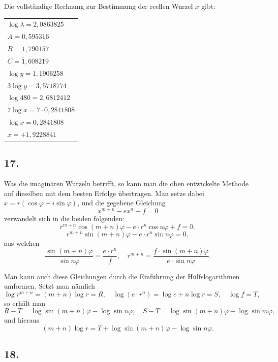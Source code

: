 \documentclass[12pt,a4paper]{article}
\newcommand{\1}{\ensuremath{\mathrlap{\,|\,}}} %
\begin{document}
Die vollständige Rechnung zur Bestimmung der reellen Wurzel $x$ gibt:

\begin{center}
\begin{tabular}{l}
$\log\lambda = 2{,}0863825$ \\
$A = 0{,}595316$ \\
$B = \overline{1}{,}790157$ \\
$C = \overline{1}{,}608219$ \\
$\log y = 1{,}1906258$ \\
$3\log y = 3{,}5718774$ \\
$\log 480 = 2{,}6812412$ \\
$7\log x = 7 \cdot 0{,}2841808$ \\
$\log x = 0{,}2841808$ \\
$x = +1{,}9228841$
\end{tabular}
\end{center}

\subsection*{17.}

Was die imaginären Wurzeln betrifft, so kann man die oben entwickelte Methode auf dieselben mit dem besten Erfolge übertragen. Man setze dabei $x = r(\cos\varphi + i\sin\varphi)$, und die gegebene Gleichung
\[x^{m+n} - ex^n + f = 0\]
verwandelt sich in die beiden folgenden:
\[r^{m+n}\cos(m+n)\varphi - e \cdot r^n\cos n\varphi + f = 0,\]
\[r^{m+n}\sin(m+n)\varphi - e \cdot r^n\sin n\varphi = 0,\]
aus welchen
\[\frac{\sin(m+n)\varphi}{\sin n\varphi} = \frac{e \cdot r^n}{f},\quad r^{m+n} = \frac{f \cdot \sin(m+n)\varphi}{e \cdot \sin n\varphi}.\]

Man kann auch diese Gleichungen durch die Einführung der Hülfslogarithmen umformen. Setzt man nämlich
\[\log r^{m+n} = (m+n)\log r = R,\quad \log(e \cdot r^n) = \log e + n\log r = S,\quad \log f = T,\]
so erhält man
\[R - T = \log\sin(m+n)\varphi - \log\sin n\varphi,\quad S - T = \log\sin(m+n)\varphi - \log\sin m\varphi,\]
und hieraus
\[(m+n)\log r = T + \log\sin(m+n)\varphi - \log\sin n\varphi.\]

\subsection*{18.}
\end{document}
